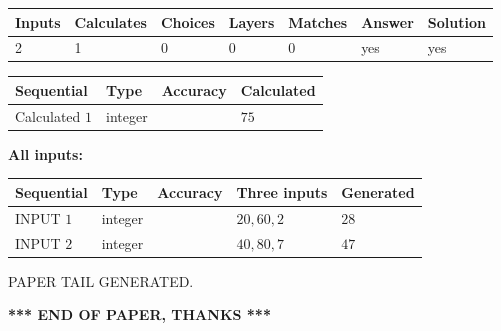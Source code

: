\documentclass[12pt]{article}
\begin{document}
 

 
   
   
   
   
\noindent\begin{tabular}{|l|l|l|l|l|l|l|}
 \hline
Inputs & Calculates & Choices & Layers & Matches & Answer & Solution \\ \hline
 2  & 
 1  & 
 0
  & 
 0  & 
 0  & 
  yes & 
  yes 
  \\ \hline
 \end{tabular}
   
   
   
   
\noindent{}
   
   
  
  
\noindent\begin{tabular}{|l|l|l|l|}
\hline
 Sequential & Type & Accuracy & Calculated \\ 
\hline
 
 
  Calculated $  1 $ & integer &  & 
  $ 75 $ 
 \\  \hline  
 \end{tabular}
   
   
   
   
\noindent\vspace{0.1in}\hspace{-0.08in} {\textbf{\Large{All inputs: }}}
   
   
  
  
\noindent\begin{tabular}{|l|l|l|l|l|}
\hline
 Sequential & Type & Accuracy & Three inputs & Generated \\ 
\hline
 
 
  INPUT $  1 $ & integer &  & $
 20
 , 
 60
 , 
 2
 $ & $ 28 $ 
 \\  \hline  
 
 
  INPUT $  2 $ & integer &  & $
 40
 , 
 80
 , 
 7
 $ & $ 47 $ 
 \\  \hline  
 \end{tabular}
   
   
   
   
   
   
 \vspace{0.2in}
 
   
   
\vspace{2.0in} PAPER TAIL GENERATED.
   
   
   
   
\vspace{1.0in} 
{\textbf{\large{ *** END OF PAPER, THANKS *** }}} 
   
\end{document}

